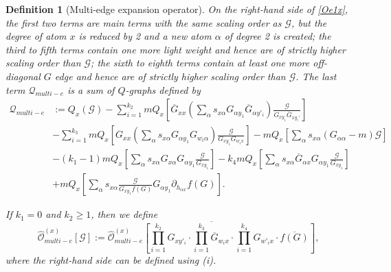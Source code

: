 \documentclass{article}
\newcommand{\1}{\mathds{1}}
\numberwithin{equation}{section}
\newcommand{\al}{\alpha}
\renewcommand{\cal}{\mathcal}
\newcommand{\wh}{\widehat}
\renewcommand{\geq}{\geqslant}
\renewcommand{\ge}{\geq}
\theoremstyle{plain} %
\newtheorem{definition}[theorem]{Definition}
\theoremstyle{remark}
\begin{document}
\begin{definition} [Multi-edge expansion operator]
 	On the right-hand side of \eqref{Oe1x}, the first two terms are main terms with the same scaling order as $\cal G$, but the degree of atom $x$ is reduced by 2 and a new atom $\al$ of degree 2 is created; the third to fifth terms contain one more light weight and hence are of  strictly higher scaling order than $\cal G$; the sixth to eighth terms contain at least one more off-diagonal $G$ edge and hence are of strictly higher scaling order than $\cal G$.  The last term $\cal Q_{multi-e} $ is a sum of $Q$-graphs defined by 
 	\begin{align*}
 		\cal Q_{multi-e} &:= Q_x \left( \cal G\right)  -  \sum_{i=1}^{k_2}m Q_x \left[ \overline G_{xx}  \left( \sum_\al s_{x\al }G_{\al y_1} \overline G_{\al y'_i}\right)\frac{\cal G}{G_{x y_1} \overline G_{xy_i'}} \right] \\
 		& - \sum_{i=1}^{k_3} m Q_x \left[ G_{xx} \left(\sum_\al s_{x\al }G_{\al y_1} G_{w_i \al} \right)\frac{\cal G}{G_{xy_1}G_{w_i x}}\right] -  m Q_x \left[  \sum_\al s_{x\al }\left(G_{\al \al}-m\right) \cal G\right] \\
 		&-(k_1-1) m Q_x \left[  \sum_\al s_{x\al }G_{x \al} G_{\al y_1}  \frac{ \cal G}{G_{xy_1}}\right] - k_4 m Q_x \left[  \sum_\al s_{x\al }\overline G_{\al x} G_{\al y_1}  \frac{\cal G}{G_{xy_1}}\right] \\
 		& +m Q_x \left[  \sum_\al s_{x\al } \frac{\cal G}{G_{x y_1}f(G)}G_{\al y_1}\partial_{h_{\al x}}f(G)  \right].
 	\end{align*} 
 	
 	 If $k_1=0$ and $k_2\ge 1$, then we define 
 	$$\wh{\cal O}_{multi-e}^{(x)} \left[\cal G\right]:= \overline{  \wh{\cal O}_{multi-e}^{(x)} \left[\prod_{i=1}^{k_2}G_{x y'_i} \cdot \prod_{i=1}^{k_3} \overline  G_{ w_i x} \cdot \prod_{i=1}^{k_4} G_{ w'_i x} \cdot \overline{f (G)}\right] },$$
 	where the right-hand side can be defined using (i).
 	
 	\medskip
 	

\end{definition}
\end{document}
